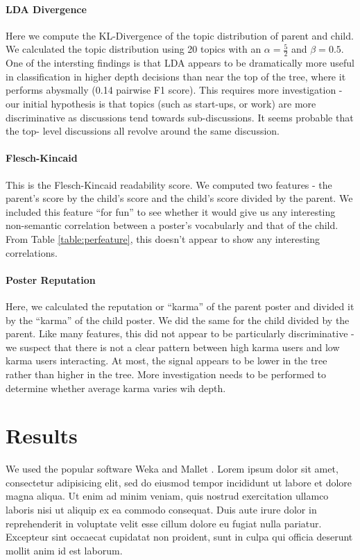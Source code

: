 \documentclass{article}
\begin{document}
\paragraph{LDA Divergence} Here we compute the KL-Divergence of the topic distribution
of parent and child. We calculated the topic distribution using 20 topics with
an $\alpha=\frac{5}{2}$ and $\beta = 0.5$. One of the intersting findings is
that LDA appears to be dramatically more useful in classification in higher
depth decisions than near the top of the tree, where it performs abysmally
(0.14 pairwise F1 score). This requires more investigation - our initial
hypothesis is that topics (such as start-ups, or work) are more discriminative
as discussions tend towards sub-discussions. It seems probable that the top-
level discussions all revolve around the same discussion.

\paragraph{Flesch-Kincaid} This is the Flesch-Kincaid readability score. We computed
two features - the parent's score by the child's score and the child's score
divided by the parent. We included this feature ``for fun'' to see whether it
would give us any interesting non-semantic correlation between a poster's
vocabularly and that of the child. From Table \ref{table:perfeature}, this
doesn't appear to show any interesting correlations.

\paragraph{Poster Reputation} Here, we calculated the reputation or ``karma'' of the
parent poster and divided it by the ``karma'' of the child poster. We did the
same for the child divided by the parent. Like many features, this did not
appear to be particularly discriminative - we suspect that there is not a
clear pattern between high karma users and low karma users interacting. At
most, the signal appears to be lower in the tree rather than higher in the
tree. More investigation needs to be performed to determine whether average
karma varies wih depth.


\section{Results}
\label{sec:results}
We used the popular software Weka \cite{Weka2009} and Mallet \cite{McCallum2002Mallet}.
Lorem ipsum dolor sit amet, consectetur adipisicing elit, sed do eiusmod
tempor incididunt ut labore et dolore magna aliqua. Ut enim ad minim veniam,
quis nostrud exercitation ullamco laboris nisi ut aliquip ex ea commodo
consequat. Duis aute irure dolor in reprehenderit in voluptate velit esse
cillum dolore eu fugiat nulla pariatur. Excepteur sint occaecat cupidatat non
proident, sunt in culpa qui officia deserunt mollit anim id est laborum.
\end{document}
